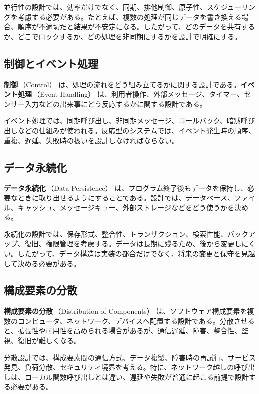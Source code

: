 \documentclass[10.5pt,a4paper]{ltjsarticle}
\newcommand{\term}[2]{\textbf{#1}\,（#2）}
\begin{document}
並行性の設計では、効率だけでなく、同期、排他制御、原子性、スケジューリングを考慮する必要がある。たとえば、複数の処理が同じデータを書き換える場合、順序が不適切だと結果が不安定になる。したがって、どのデータを共有するか、どこでロックするか、どの処理を非同期にするかを設計で明確にする。

\subsection{制御とイベント処理}

\term{制御}{Control} は、処理の流れをどう組み立てるかに関する設計である。\term{イベント処理}{Event Handling} は、利用者操作、外部メッセージ、タイマー、センサー入力などの出来事にどう反応するかに関する設計である。

イベント処理では、同期呼び出し、非同期メッセージ、コールバック、暗黙呼び出しなどの仕組みが使われる。反応型のシステムでは、イベント発生時の順序、重複、遅延、失敗時の扱いを設計しなければならない。

\subsection{データ永続化}

\term{データ永続化}{Data Persistence} は、プログラム終了後もデータを保持し、必要なときに取り出せるようにすることである。設計では、データベース、ファイル、キャッシュ、メッセージキュー、外部ストレージなどをどう使うかを決める。

永続化の設計では、保存形式、整合性、トランザクション、検索性能、バックアップ、復旧、権限管理を考慮する。データは長期に残るため、後から変更しにくい。したがって、データ構造は実装の都合だけでなく、将来の変更と保守を見越して決める必要がある。

\subsection{構成要素の分散}

\term{構成要素の分散}{Distribution of Components} は、ソフトウェア構成要素を複数のコンピュータ、ネットワーク、デバイスへ配置する設計である。分散させると、拡張性や可用性を高められる場合があるが、通信遅延、障害、整合性、監視、復旧が難しくなる。

分散設計では、構成要素間の通信方式、データ複製、障害時の再試行、サービス発見、負荷分散、セキュリティ境界を考える。特に、ネットワーク越しの呼び出しは、ローカル関数呼び出しとは違い、遅延や失敗が普通に起こる前提で設計する必要がある。
\end{document}
